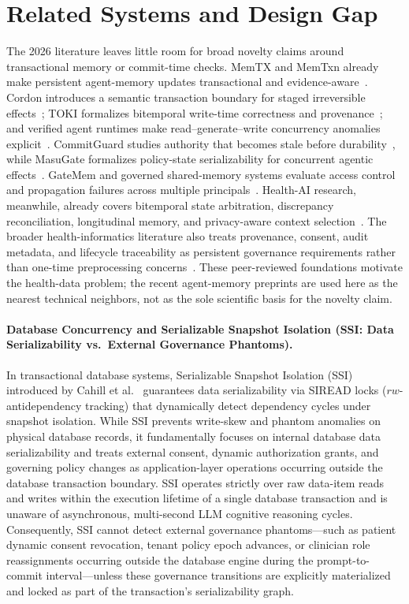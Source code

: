 \documentclass[11pt]{article}
\begin{document}
\section{Related Systems and Design Gap}
The 2026 literature leaves little room for broad novelty claims around transactional memory or commit-time checks. MemTX and MemTxn already make persistent agent-memory updates transactional and evidence-aware~\cite{memtx,memtxn}. Cordon introduces a semantic transaction boundary for staged irreversible effects~\cite{cordon}; TOKI formalizes bitemporal write-time correctness and provenance~\cite{toki}; and verified agent runtimes make read--generate--write concurrency anomalies explicit~\cite{verifiedconcurrency}. CommitGuard studies authority that becomes stale before durability~\cite{temporaryauth}, while MasuGate formalizes policy-state serializability for concurrent agentic effects~\cite{statefulgov}. GateMem and governed shared-memory systems evaluate access control and propagation failures across multiple principals~\cite{gatemem,memclaw}. Health-AI research, meanwhile, already covers bitemporal state arbitration, discrepancy reconciliation, longitudinal memory, and privacy-aware context selection~\cite{zhao2026,dualstream,healthclaw}. The broader health-informatics literature also treats provenance, consent, audit metadata, and lifecycle traceability as persistent governance requirements rather than one-time preprocessing concerns~\cite{sembay2023,rule2024,futureai2025,dynamicconsent2022}. These peer-reviewed foundations motivate the health-data problem; the recent agent-memory preprints are used here as the nearest technical neighbors, not as the sole scientific basis for the novelty claim.

\paragraph{Database Concurrency and Serializable Snapshot Isolation (SSI: Data Serializability vs.\ External Governance Phantoms).}
In transactional database systems, Serializable Snapshot Isolation (SSI) introduced by Cahill et al.~\cite{cahill2008,cahill2009} guarantees data serializability via SIREAD locks ($rw$-antidependency tracking) that dynamically detect dependency cycles under snapshot isolation. While SSI prevents write-skew and phantom anomalies on physical database records, it fundamentally focuses on internal database data serializability and treats external consent, dynamic authorization grants, and governing policy changes as application-layer operations occurring outside the database transaction boundary. SSI operates strictly over raw data-item reads and writes within the execution lifetime of a single database transaction and is unaware of asynchronous, multi-second LLM cognitive reasoning cycles. Consequently, SSI cannot detect external governance phantoms---such as patient dynamic consent revocation, tenant policy epoch advances, or clinician role reassignments occurring outside the database engine during the prompt-to-commit interval---unless these governance transitions are explicitly materialized and locked as part of the transaction's serializability graph.
\end{document}
